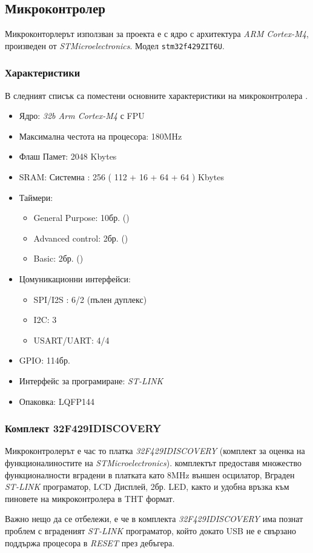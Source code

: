 \subsection{Микроконтролер}

Микроконторлерът използван за проекта е с ядро с архитектура \textit{ARM Cortex-M4},
произведен от \textit{STMicroelectronics}.
Модел \texttt{stm32f429ZIT6U}.

\subsubsection{Характеристики}

В следният списък са поместени основните характеристики
на микроконтролера \cite{stmmcudatasheet}.

\begin{itemize} 
    \item Ядро: \textit{32b Arm Cortex-M4} с FPU
    \item Максимална честота на процесора: 180MHz
    \item Флаш Памет: 2048 Kbytes
    \item SRAM: Системна : 256 ( 112 + 16 + 64 + 64 ) Kbytes
    \item Таймери:
    \begin{itemize} 
        \item General Purpose: 10бр. ()
        \item Advanced control: 2бр. ()
        \item Basic: 2бр. ()
    \end{itemize}     
    \item Цомуникационни интерфейси:
    \begin{itemize}
        \item SPI/I2S : 6/2 (пълен дуплекс) 
        \item I2C: 3
        \item USART/UART: 4/4
    \end{itemize} 
    
    \item GPIO: 114бр.
    \item Интерфейс за програмиране: \textit{ST-LINK}
    \item Опаковка: LQFP144 
\end{itemize} 

\subsubsection{Комплект 32F429IDISCOVERY}

Микроконтролерът е час то платка \textit{32F429IDISCOVERY} 
(комплект за оценка на функционалиностите на \textit{STMicroelectronics}).
комплектът предоставя множество функционалности вградени в платката като
8MHz външен осцилатор, Вграден \textit{ST-LINK} програматор,
LCD Дисплей, 2бр. LED, както и удобна връзка към пиновете на
микроконтролера в THT формат.

Важно нещо да се отбележи, е че в комплекта \textit{32F429IDISCOVERY}
има познат проблем с вграденият \textit{ST-LINK} програматор,
който докато USB не е свързано поддържа процесора в \textit{RESET}
през дебъгера.


